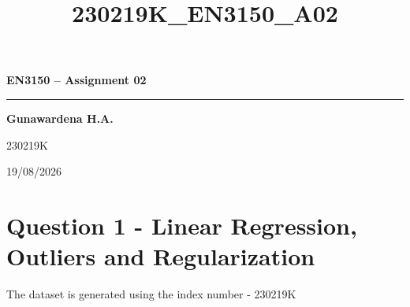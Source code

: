 \documentclass[11pt]{article}
\title{230219K\_EN3150\_A02}
\begin{document}
\begin{titlepage}
\thispagestyle{empty}
\centering

\vspace*{5.0cm}

{\Large\bfseries\color{reportnavy} EN3150 -- Assignment 02\par}
\vspace{0.45cm}
{\color{reportnavy}\rule{0.72\textwidth}{1.1pt}\par}

\vspace{2.0cm}

{\LARGE\bfseries Gunawardena H.A.\par}
\vspace{0.45cm}
{\Large 230219K\par}

\vfill

{\large 19/08/2026\par}
\vspace{1.2cm}

\end{titlepage}


\setcounter{page}{1}
\pagestyle{fancy}

    \section{Question 1 - Linear Regression, Outliers and
Regularization}\label{question-1---linear-regression-outliers-and-regularization}

The dataset is generated using the index number - 230219K
\end{document}

